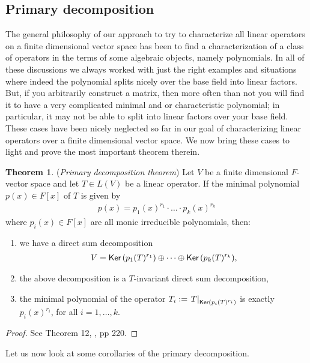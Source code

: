 \documentclass[letterpaper,11pt,twoside]{article}
\theoremstyle{definition}
\theoremstyle{definition}
\newtheorem{theorem}[proposition]{Theorem}
\theoremstyle{definition}
\theoremstyle{definition}
\theoremstyle{definition}
\theoremstyle{definition}
\theoremstyle{remark}
\theoremstyle{definition}
\newcommand{\Ker}[1]{{\fontfamily{lmss}\selectfont 
		\text{Ker}\left (#1\right )
}}
\newcommand{\rest}[2]{\left. { #1 }\right \vert_{#2}}
\begin{document}
    \subsection{Primary decomposition}
    The general philosophy of our approach to try to characterize all linear operators on a finite dimensional vector space has been to find a characterization of a class of operators in the terms of some algebraic objects, namely polynomials. In all of these discussions we always worked with just the right examples and situations where indeed the polynomial splits nicely over the base field into linear factors. But, if you arbitrarily construct a matrix, then more often than not you will find it to have a very complicated minimal and or characteristic polynomial; in particular, it may not be able to split into linear factors over your base field. These cases have been nicely neglected so far in our goal of characterizing linear operators over a finite dimensional vector space. We now bring these cases to light and prove the most important theorem therein.
    \begin{theorem}\label{T-2.8.1}(\textit{Primary decomposition theorem}) 
    Let $V$ be a finite dimensional $F$-vector space and let $T\in L(V)$ be a linear operator. If the minimal polynomial $p(x)\in F[x]$ of $T$ is given by 
    \begin{align*}
        p(x) = p_1(x)^{r_1}\cdot \dots \cdot p_k(x)^{r_k}
    \end{align*}
    where $p_i(x) \in F[x] $ are all monic irreducible polynomials, then:
    \begin{enumerate}
        \item {we have a direct sum decomposition
        \begin{align*}
            V = \Ker{p_1(T)^{r_1}} \oplus \dots \oplus \Ker{p_k(T)^{r_k}},
        \end{align*}
        }
        \item{the above decomposition is a $T$-invariant direct sum decomposition,}
        \item{the minimal polynomial of the operator $T_i := \rest{T}{\Ker{p_i(T)^{r_i}}}$ is exactly $p_i(x)^{r_i}$, for all $i=1,\dots, k$.}
    \end{enumerate}
    \end{theorem}
    \begin{proof}
    	See Theorem 12, \cite{HK71}, pp 220.
    \end{proof}
    Let us now look at some corollaries of the primary decomposition.
\end{document}
